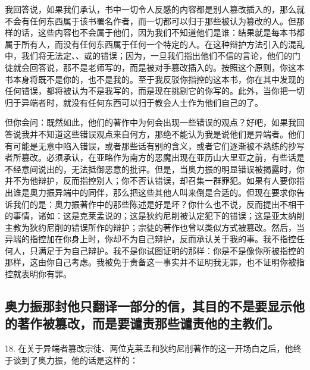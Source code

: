 \par

我回答说，如果我们承认，书中一切令人反感的内容都是别人篡改插入的，那么就不会有任何东西属于该书署名作者，而一切都可以归于那些被认为篡改的人。但那样的话，这些内容也不会属于他们，因为我们不知道他们是谁：结果就是每本书都属于所有人，而没有任何东西属于任何一个特定的人。在这种辩护方法引入的混乱中，我们将无法定、、或的错误；因为，一旦我们指出他们不信的言论，他们的门徒就会回答说，那不是老师写的，而是被对手篡改插入的。按照这个原则，你这本书本身将既不是你的，也不是我的。至于我反驳你指控的这本书，你在其中发现的任何错误，都将被认为不是我写的，而是现在挑剔它的你写的。此外，当你把一切归于异端者时，就没有任何东西可以归于教会人士作为他们自己的了。\par

但你会问：既然如此，他们的著作中为何会出现一些错误的观点？好吧，如果我回答说我并不知道这些错误观点来自何方，那绝不能认为我是说他们是异端者。他们有可能是无意中陷入错误，或者那些话有别的含义，或者它们逐渐被不熟练的抄写者所篡改。必须承认，在亚略作为南方的恶魔出现在亚历山大里亚之前，有些话是不经意间说出的，无法抵御恶意的批评。但是，当奥力振的明显错误被揭露时，你并不为他辩护，反而指控别人；你不否认错误，却召集一群罪犯。如果有人要你指出谁是奥力振异端中的同伴，那么把这些其他人叫来倒是合适的。但现在要求你告诉我们的是：奥力振著作中的那些陈述是好是坏？你什么也不说，反而提出不相干的事情，诸如：这是克莱孟说的；这是狄约尼削被认定犯下的错误；这是亚太纳削主教为狄约尼削的错误所作的辩护；宗徒的著作也曾以类似方式被篡改。然后，当异端的指控加在你身上时，你却不为自己辩护，反而承认关于我的事。我不指控任何人，只满足于为自己辩护。我不是你试图证明的那样：你是不是像你所被指控的那样，这由你自己考虑。我被免于责备这一事实并不证明我无罪，也不证明你被指控就表明你有罪。\par


\subsection{奥力振那封他只翻译一部分的信，其目的不是要显示他的著作被篡改，而是要谴责那些谴责他的主教们。}

18. 在关于异端者篡改宗徒、两位克莱孟和狄约尼削著作的这一开场白之后，他终于谈到了奥力振，他的话是这样的：\par

